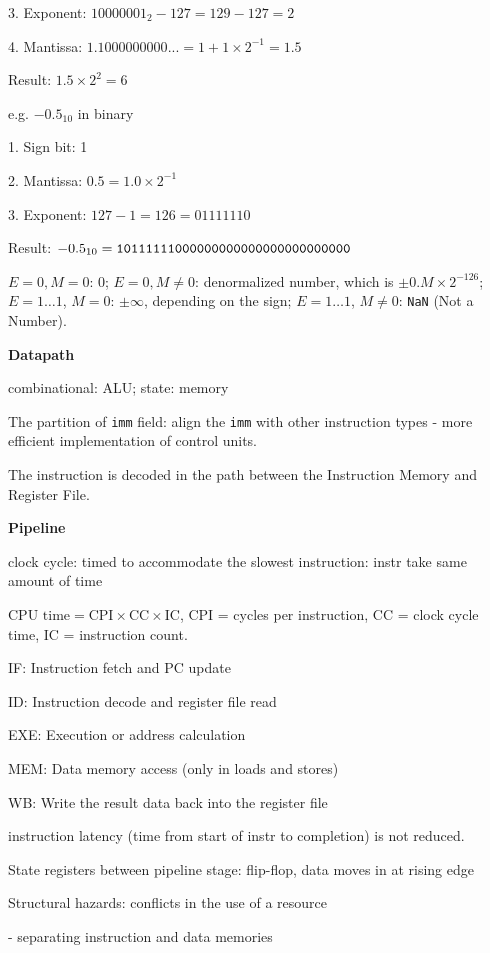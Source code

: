 \documentclass[10pt,landscape,a4paper]{article}
\begin{document}
\begin{multicols}{3}
3. Exponent: \(10000001_2 - 127 = 129 - 127 = 2\)

4. Mantissa: \(1.1000000000... = 1 + 1 \times 2^{-1} = 1.5\)

Result: \(1.5 \times 2^2 =6\)

e.g. \(-0.5_{10}\) in binary 

1. Sign bit: 1 
  
2. Mantissa: \(0.5 = 1.0 \times 2^{-1}\)  
  
3. Exponent: \(127 - 1 = 126 = 0111 1110\)

Result: \(-0.5_{10} = \verb|10111111000000000000000000000000|\)

\(E = 0, M = 0\): 0; \(E = 0, M \neq 0\): denormalized number, which is \(\pm 0.M \times 2^{-126}\); \(E = 1\ldots 1\), \(M = 0\): \(\pm \infty\), depending on the sign; \(E = 1\ldots 1\), \(M \neq 0\): \verb|NaN| (Not a Number).

\textbf{Datapath}

combinational: ALU; state: memory

The partition of \verb|imm| field: align the \verb|imm| with other instruction types - more efficient implementation of control units.

The instruction is decoded in the path between the Instruction Memory and Register File.

\textbf{Pipeline}

clock cycle: timed to accommodate the slowest instruction: instr take same amount of time

\(\text{CPU time} = \text{CPI} \times \text{CC} \times \text{IC}\), CPI = cycles per instruction, CC = clock cycle time, IC = instruction count.

IF: Instruction fetch and PC update

ID: Instruction decode and register file read

EXE: Execution or address calculation

MEM: Data memory access (only in loads and stores)

WB: Write the result data back into the register file

instruction latency (time from start of instr to completion) is not reduced.

State registers between pipeline stage: flip-flop, data moves in at rising edge 

Structural hazards: conflicts in the use of a resource

- separating instruction and data memories


\end{multicols}
\end{document}
